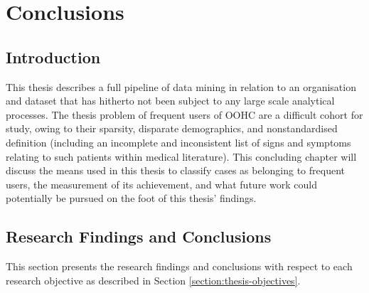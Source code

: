  \chapter{Conclusions}
\section{Introduction}

This thesis describes a full pipeline of data mining in relation to an organisation and dataset that has hitherto not been subject to any large scale analytical processes.  The thesis problem of frequent users of OOHC are a difficult cohort for study, owing to their sparsity, disparate demographics, and nonstandardised definition (including an incomplete and inconsistent list of signs and symptoms relating to such patients within medical literature). This concluding chapter will discuss the means used in this thesis to classify cases as belonging to frequent users, the measurement of its achievement, and what future work could potentially be pursued on the foot of this thesis' findings.  




\begin{comment}
\section{Ethical Considerations}

The primary ethical consideration that arises from the research in this thesis is the prospect of a medical care provider theoretically using a system, such as the one described in \ref{}, not for the purposes of early detection of frequent users for intervention and treatment, but rather the opposite: to purposefully exclude these patients from treatment due to the increased level of care that they require, relative to the general population. It is clear that a means of classifying frequent user cases cannot be done in isolation  
\end{comment}



\section{Research Findings and Conclusions}
This section presents the research findings and conclusions with respect to each 
research objective as described in Section \ref{section:thesis-objectives}. \\

